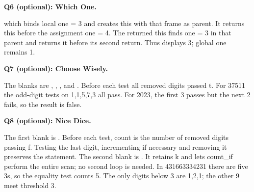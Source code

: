 \documentclass[10pt]{scrartcl}
\begin{document}
\begin{prob}
\textbf{Q6 (optional): Which One.} 
\begin{steps}
\ii which binds local one = 3 and creates this with that frame as parent. It returns this before the assignment one = 4.
\ii The returned this finds one = 3 in that parent and returns it before its second return. Thus  displays 3; global one remains 1.
\end{steps}
\begin{fig}
\end{fig}
\end{prob}
\begin{prob}
\textbf{Q7 (optional): Choose Wisely.} 
\begin{steps}
\ii The blanks are , , , and . Before each test all removed digits passed t.
\ii For 37511 the odd-digit tests on 1,1,5,7,3 all pass. For 2023, the first 3 passes but the next 2 fails, so the result is false.
\end{steps}
\end{prob}
\begin{prob}
\textbf{Q8 (optional): Nice Dice.} 
\begin{steps}
\ii The first blank is . Before each test, count is the number of removed digits passing f. Testing the last digit, incrementing if necessary and removing it preserves the statement.
\ii The second blank is . It retains k and lets count\_if perform the entire scan; no second loop is needed.
\ii In 431663334231 there are five 3s, so the equality test counts 5. The only digits below 3 are 1,2,1; the other 9 meet threshold 3.
\end{steps}
\end{prob}
\end{document}
